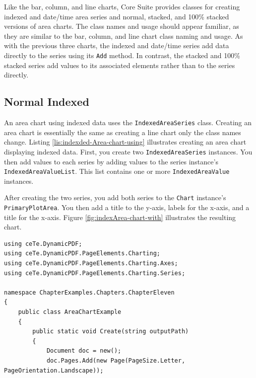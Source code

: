 \documentclass[american,letterpaper]{tufte-book}
\numberwithin{equation}{section}
\numberwithin{figure}{section}
\begin{document}
{\medskip{}

Like the bar, column, and line charts, Core Suite provides classes
for creating indexed and date/time area series and normal, stacked,
and 100\% stacked versions of area charts. The class names and usage
should appear familiar, as they are similar to the bar, column, and
line chart class naming and usage. As with the previous three charts,
the indexed and date/time series add data directly to the series using
its \texttt{Add} method. In contrast, the stacked and 100\% stacked
series add values to its associated elements rather than to the series
directly.

\subsection{Normal Indexed}

An area chart using indexed data uses the \texttt{IndexedAreaSeries}
class. Creating an area chart is essentially the same as creating
a line chart only the class names change. Listing \ref{lis:indexded-Area-chart-using}
illustrates creating an area chart displaying indexed data. First,
you create two \texttt{IndexedAreaSeries} instances. You then add values
to each series by adding values to the series instance's \texttt{IndexedAreaValueList}.
This list contains one or more \texttt{IndexedAreaValue} instances. 

After creating the two series, you add both series to the \texttt{Chart}
instance's \texttt{PrimaryPlotArea}. You then add a title to the y-axis,
labels for the x-axis, and a title for the x-axis. Figure \ref{fig:indexArea-chart-with}
illustrates the resulting chart.

\bgroup{}
\begin{lstlisting}[caption={Area chart using indexed data.},label={lis:indexded-Area-chart-using},basicstyle={\small\ttfamily},breaklines=true]
using ceTe.DynamicPDF;
using ceTe.DynamicPDF.PageElements.Charting;
using ceTe.DynamicPDF.PageElements.Charting.Axes;
using ceTe.DynamicPDF.PageElements.Charting.Series;

namespace ChapterExamples.Chapters.ChapterEleven
{
    public class AreaChartExample
    {
        public static void Create(string outputPath)
        {
            Document doc = new();
            doc.Pages.Add(new Page(PageSize.Letter, PageOrientation.Landscape));


\end{lstlisting}}
\end{document}
